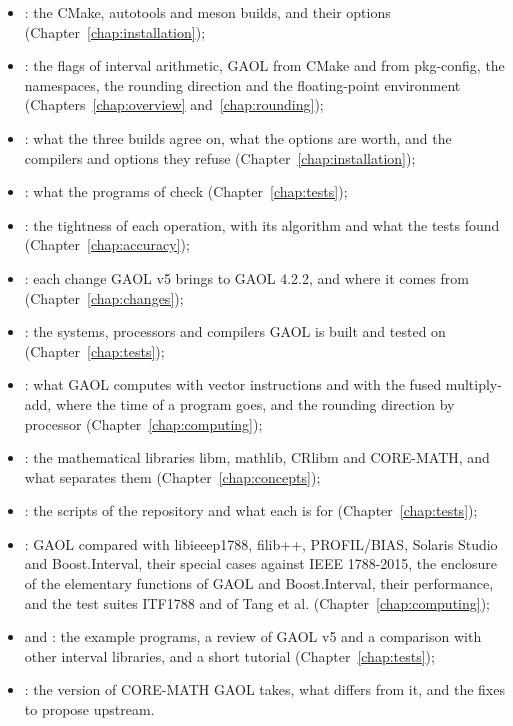 \documentclass[12pt,a4paper,twoside,openright]{book}
\begin{document}
\begin{itemize}
\item {}: the CMake, autotools and meson builds, and
  their options (Chapter~\ref{chap:installation});
\item {}: the flags of interval arithmetic, GAOL from CMake
  and from pkg-config, the namespaces, the rounding direction and the
  floating-point environment (Chapters~\ref{chap:overview}
  and~\ref{chap:rounding});
\item {}: what the three builds agree on, what the
  options are worth, and the compilers and options they refuse
  (Chapter~\ref{chap:installation});
\item {}: what the programs of  check
  (Chapter~\ref{chap:tests});
\item {}: the tightness of each operation, with its
  algorithm and what the tests found (Chapter~\ref{chap:accuracy});
\item {}: each change GAOL v5 brings to GAOL 4.2.2,
  and where it comes from (Chapter~\ref{chap:changes});
\item {}: the systems, processors and
  compilers GAOL is built and tested on (Chapter~\ref{chap:tests});
\item {}: what GAOL computes with vector instructions and
  with the fused multiply-add, where the time of a program goes, and the
  rounding direction by processor (Chapter~\ref{chap:computing});
\item {}: the mathematical libraries libm,
  mathlib, CRlibm and CORE-MATH, and what separates them
  (Chapter~\ref{chap:concepts});
\item {}: the scripts of the repository and what each is
  for (Chapter~\ref{chap:tests});
\item {}: GAOL compared with libieeep1788,
  filib++, PROFIL/BIAS, Solaris Studio and Boost.Interval, their special
  cases against IEEE 1788-2015, the enclosure of the elementary functions of
  GAOL and Boost.Interval, their performance, and the test suites ITF1788 and
  of Tang et al. (Chapter~\ref{chap:computing});
\item {} and : the
  example programs, a review of GAOL v5 and a comparison with other interval
  libraries, and a short tutorial (Chapter~\ref{chap:tests});
\item {}: the version of CORE-MATH GAOL takes, what differs
  from it, and the fixes to propose upstream.
\end{itemize}
\end{document}
